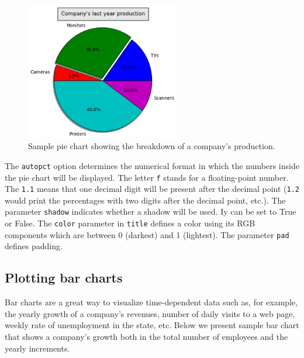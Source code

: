 \documentclass[article,A4,12pt]{llncs}
\begin{document}
\newpage
\begin{figure}[!ht]
\begin{center}
\includegraphics[width=0.6\textwidth]{img/piechart.png}
\end{center}
\vspace{-2mm}
\caption{Sample pie chart showing the breakdown of a company's production.}
\label{fig:piech}
\end{figure}
\noindent
The {\tt autopct} option determines the numerical format in which the numbers inside the 
pie chart will be displayed. The letter {\tt f} stands for a floating-point number. The {\tt 1.1} means 
that one decimal digit will be present after the decimal point ({\tt 1.2} would print the percentages
with two digits after the decimal point, etc.). The parameter {\tt shadow} indicates whether 
a shadow will be used. Iy can be set to True or False. 
The {\tt color} parameter in {\tt title} defines a color using its RGB components 
which are between 0 (darkest) and 1 (lightest). The parameter {\tt pad} defines padding.

\subsection[\ \ Plotting bar charts]{Plotting bar charts}

Bar charts are a great way to visualize time-dependent data such as, for 
example, the yearly growth of a company's revenues, 
number of daily visits to a web page, weekly rate of unemployment 
in the state, etc. Below we present sample bar chart that 
shows a company's growth both in the total number of 
employees and the yearly increments.
\end{document}
